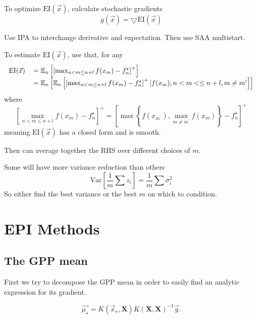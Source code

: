 \documentclass[phd,tocprelim]{cornell}
\begin{document}
To optimize $\mbox{EI}(\vec{x})$, calculate stochastic gradients
\begin{equation}
 g(\vec{x}) = \bigtriangledown \mbox{EI}(\vec{x})
\end{equation}

Use IPA to interchange derivative and expectation. Then use SAA multistart.

To estimate $\mbox{EI}(\vec{x})$, use that, for any
\begin{equation}
 \begin{tabular}{rl} $\mbox{EI}(\vec{x})$ & $= \mathbb{E}_{n} \left[ \left[ \max_{n < m \leq n+l} f(x_{m}) - f_{n}^{\star} \right]^{+} \right]$ \\
  & $= \mathbb{E}_{n} \left[ \mathbb{E}_{n} \left[ \left[ \max_{n < m \leq n + l} f(x_{m}) - f^{\star}_{n} \right]^{+} | f(x_{m}), n < m < \leq n + l, m \neq m^{\prime} \right] \right]$ \end{tabular}
\end{equation}
where
\begin{equation}
 \left[ \max_{n < m \leq n + l} f(x_{m}) - f^{\star}_{n} \right]^{+} = \left[ \max \left\{ f(x_{m^{\prime}}), \max_{m \neq m^{\prime}} f(x_{m}) \right\} - f_{n}^{\star} \right]^{+}
\end{equation}
meaning $\mbox{EI}(\vec{x})$ has a closed form and is smooth.

Then can average together the RHS over different choices of $m$.

Some will have more variance reduction than others
\begin{equation}
 \mbox{Var}\left[\frac{1}{m} \sum z_{i}\right] = \frac{1}{m} \sum \sigma_{i}^{2}
\end{equation}
So either find the best variance or the best $m$ on which to condition.


\chapter{EPI Methods} %
\label{cha:EPI Methods}

\section{The GPP mean}

First we try to decompose the GPP mean in order to easily find an analytic expression for its gradient.

\begin{equation}
 \vec{\mu_{\star}} = K(\vec{x}_{\star}, \textbf{X} )K(\textbf{X},\textbf{X})^{-1}\vec{y}.
\end{equation}
\end{document}
